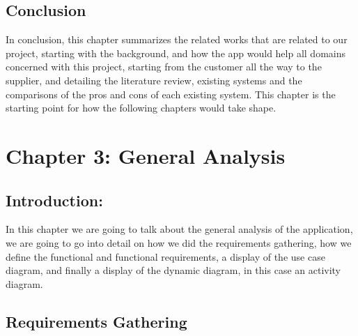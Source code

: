 \documentclass{article}
\begin{document}
       
      \subsection{Conclusion}
      In conclusion, this chapter summarizes the related works that are related to our project, starting with the background, and how the app would help all domains concerned with this project, starting from the customer all the way to the supplier, and detailing the literature review, existing systems and the comparisons of the pros and cons of each existing system. This chapter is the starting point for how the following chapters would take shape.

      \section{Chapter 3: General Analysis}
      \subsection{Introduction:}
      In this chapter we are going to talk about the general analysis of the application, we are going to go into detail on how we did the requirements gathering, how we define the functional and functional requirements, a display of the use case diagram, and finally a display of the dynamic diagram, in this case an activity diagram.
      
      \subsection{Requirements Gathering}
      
\end{document}
